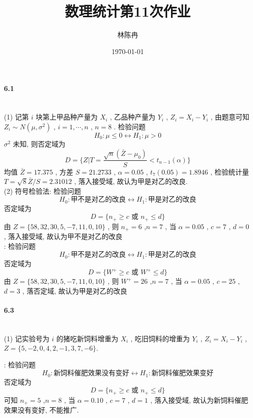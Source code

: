 \documentclass[a4paper, UTF8]{ctexart}
\title{数理统计第11次作业}
\author{林陈冉}
\date{\today}
\begin{document}
    \maketitle
    \paragraph{6.1}\quad\\
        \noindent(1) 记第 $i$ 块第上甲品种产量为 $X_i$ , 乙品种产量为 $Y_i$ , $Z_i=X_i-Y_i$ , 由题意可知 $Z_i\sim N(\mu, \sigma^2)$ , $i=1, \cdots, n$ , $n=8$ . 检验问题
        \[H_0:\mu \le 0 \leftrightarrow H_1:\mu > 0\]
        $\sigma^2$ 未知, 则否定域为 
        \[D=\{Z|T=\frac{\sqrt{n}(\bar{Z}-\mu_0)}{S}<t_{n-1}(\alpha)\}\]
        均值 $\bar{Z}=17.375$ , 方差 $S=21.2733$ , $\alpha=0.05$ , $t_{7}(0.05)=1.8946$ , 检验统计量 $T=\sqrt{8}\bar{Z}/S=2.31012$ ,
        落入接受域, 故认为甲是对乙的改良.\\

        \noindent(2) 符号检验法: 检验问题
        \[H_0 : \text{甲不是对乙的改良} \leftrightarrow H_1 : \text{甲是对乙的改良}\]
        否定域为
        \[D=\{n_+ \ge c \text{ 或 } n_+ \le d\}\]
        由 $Z = \{58, 32, 30, 5, -7, 11, 0, 10\}$ , 则 $n_+ = 6$ ,$n = 7$ , 当 $\alpha = 0.05$ , $c = 7$ , $d = 0$ ,
        落入接受域, 故认为甲不是对乙的改良\\

        : 检验问题
        \[H_0 : \text{甲不是对乙的改良} \leftrightarrow H_1 : \text{甲是对乙的改良}\]
        否定域为
        \[D=\{W^+ \ge c \text{ 或 } W^+ \le d\}\]
        由 $Z = \{58, 32, 30, 5, -7, 11, 0, 10\}$ , 则 $W^+ = 26$ ,$n = 7$ , 当 $\alpha = 0.05$ , $c = 25$ , $d = 3$ ,
        落否定域, 故认为甲是对乙的改良\\
     
     \paragraph{6.3}\quad\\
        \noindent(1) 记实验号为 $i$ 的猪吃新饲料增重为 $X_i$ , 吃旧饲料的增重为 $Y_i$ , $Z_i=X_i-Y_i$ , $Z=\{5,-2,0,4,2,-1,3,7,-6\}$.

        : 检验问题
        \[H_0 : \text{新饲料催肥效果没有变好} \leftrightarrow H_1 : \text{新饲料催肥效果变好}\]
        否定域为
        \[D=\{n_+ \ge c \text{ 或 } n_+ \le d\}\]
        可知 $n_+ = 5$ ,$n = 8$ , 当 $\alpha = 0.10$ , $c = 7$ , $d = 1$ ,
        落入接受域, 故认为新饲料催肥效果没有变好, 不能推广.\\
\end{document}
